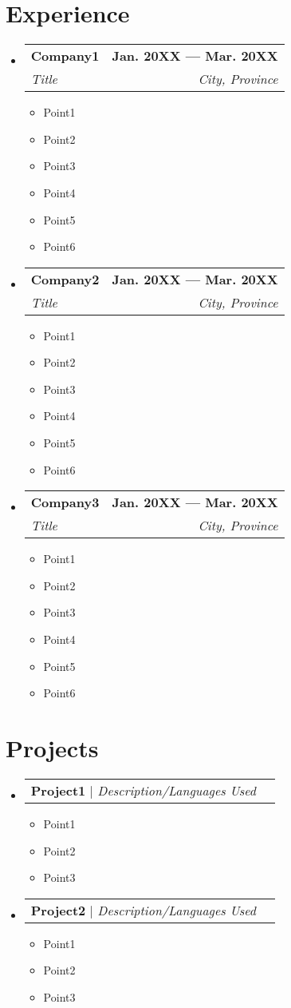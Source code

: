 \documentclass[letterpaper,11pt]{article}
\makeatletter
\newcommand{\resumeItem}[1]{
  \item\small{
    {#1 \vspace{-2pt}}
  }
}
\newcommand{\resumeSubheading}[4]{
  \vspace{-2pt}\item
    \begin{tabular*}{1.0\textwidth}[t]{l@{\extracolsep{\fill}}r}
      \textbf{#1} & \textbf{\small #2} \\
      \textit{\small#3} & \textit{\small #4} \\
    \end{tabular*}\vspace{-7pt}
}
\newcommand{\resumeProjectHeading}[2]{
    \item
    \begin{tabular*}{1.001\textwidth}{l@{\extracolsep{\fill}}r}
      \small#1 & \textbf{\small #2}\\
    \end{tabular*}\vspace{-7pt}
}
\newcommand{\resumeSubHeadingListStart}{\begin{itemize}[leftmargin=0.0in, label={}]}
\newcommand{\resumeSubHeadingListEnd}{\end{itemize}}
\newcommand{\resumeItemListStart}{\begin{itemize}}
\newcommand{\resumeItemListEnd}{\end{itemize}\vspace{-5pt}}
\makeatother
\begin{document}
\section{Experience}
  \resumeSubHeadingListStart
    \resumeSubheading
      {Company1}{Jan. 20XX --- Mar. 20XX}
      {Title}{City, Province}
      \resumeItemListStart
        \resumeItem{Point1}
        \resumeItem{Point2}
        \resumeItem{Point3}
        \resumeItem{Point4}
        \resumeItem{Point5}
        \resumeItem{Point6}
    \resumeItemListEnd
    \resumeSubheading
      {Company2}{Jan. 20XX --- Mar. 20XX}
      {Title}{City, Province}
      \resumeItemListStart
        \resumeItem{Point1}
        \resumeItem{Point2}
        \resumeItem{Point3}
        \resumeItem{Point4}
        \resumeItem{Point5}
        \resumeItem{Point6}
    \resumeItemListEnd
    \resumeSubheading
      {Company3}{Jan. 20XX --- Mar. 20XX}
      {Title}{City, Province}
      \resumeItemListStart
        \resumeItem{Point1}
        \resumeItem{Point2}
        \resumeItem{Point3}
        \resumeItem{Point4}
        \resumeItem{Point5}
        \resumeItem{Point6}
    \resumeItemListEnd
  \resumeSubHeadingListEnd

\section{Projects}
    \vspace{-5pt}
    \resumeSubHeadingListStart
        \resumeProjectHeading
          {\textbf{Project1} $|$ \emph{Description/Languages Used}}{}
          \resumeItemListStart
            \resumeItem{Point1}
            \resumeItem{Point2}
            \resumeItem{Point3}
          \resumeItemListEnd 
          \vspace{-20pt}
      \resumeProjectHeading
          {\textbf{Project2} $|$ \emph{Description/Languages Used}}{}
          \resumeItemListStart
            \resumeItem{Point1}
            \resumeItem{Point2}
            \resumeItem{Point3}
          \resumeItemListEnd
          \vspace{-13pt}
    \resumeSubHeadingListEnd
\vspace{-15pt}
\end{document}
